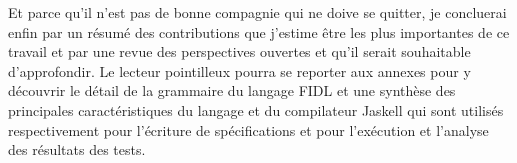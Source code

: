 Et parce qu'il n'est pas de bonne compagnie qui ne doive se quitter,
je concluerai enfin par un r\'esum\'e des contributions que j'estime \^etre
les plus importantes de ce travail et par une revue des perspectives
ouvertes et qu'il serait souhaitable d'approfondir. Le lecteur
pointilleux pourra se reporter aux annexes pour y d\'ecouvrir le
d\'etail de la grammaire du langage FIDL et une synth\`ese des
principales caract\'eristiques du langage et du compilateur Jaskell
qui sont utilis\'es respectivement pour l'\'ecriture de
sp\'ecifications et pour l'ex\'ecution et l'analyse des r\'esultats
des tests. 

